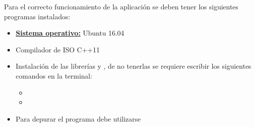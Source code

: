 Para el correcto funcionamiento de la aplicación se deben tener los siguientes
programas instalados:
\begin{itemize}
    \item \underline{\textbf{Sistema operativo:}} Ubuntu 16.04
    \item Compilador de ISO C++11
    \item Instalación de las librerías  y ,
    de no tenerlas se requiere escribir los siguientes comandos en la terminal:
    \begin{itemize}
        \item {}
        \item {}
    \end{itemize}
    \item Para depurar el programa debe utilizarse 
\end{itemize}